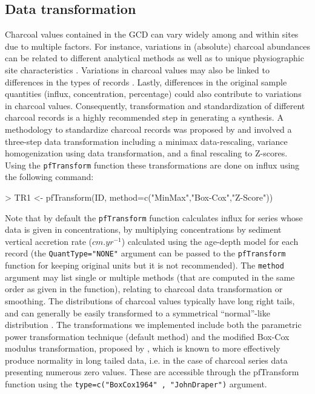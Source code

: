 \documentclass{elsarticle}
\begin{document}
\subsection{Data transformation}

Charcoal values contained in the GCD can vary widely among and within sites due to multiple factors. For instance, variations in (absolute) charcoal abundances can be related to different analytical methods \citetext{i.e. sediment treatment; \citealp{Tinner2003}} as well as to unique physiographic site characteristics \cite{Marlon2006}. Variations in charcoal values may also be linked to differences in the types of records \citetext{pollen slide charcoals, sieved charcoals, charcoal/pollen ratios, \citealt{Carcaillet2001a}}. Lastly, differences in the original sample quantities (influx, concentration, percentage) could also contribute to variations in charcoal values. Consequently, transformation and standardization of different charcoal records is a highly recommended step in generating a synthesis. A methodology to standardize charcoal records was proposed by \citet{Power2008} and involved a three-step data transformation including a minimax data-rescaling, variance homogenization using \citet{Box1964} data transformation, and a final rescaling to Z-scores. Using the \texttt{pfTransform} function these transformations are done on influx using the following command:

\begin{Schunk}
\begin{Sinput}
> TR1 <- pfTransform(ID, method=c("MinMax","Box-Cox","Z-Score"))
\end{Sinput}
\end{Schunk}


Note that by default the \texttt{pfTransform} function calculates influx for series whose data is given in concentrations, by multiplying concentrations by sediment vertical accretion rate ($cm.yr^{-1}$) calculated using the age-depth model for each record (the \texttt{QuantType="NONE"} argument can be passed to the \texttt{pfTransform} function for keeping original units but it is not recommended). The \texttt{method} argument may list single or multiple methods (that are computed in the same order as given in the function), relating to charcoal data transformation or smoothing. The distributions of charcoal values typically have long right tails, and can generally be easily transformed to a symmetrical “normal”-like distribution \cite{Higuera2011}.  The transformations we implemented include both the \citet{Box1964} parametric power transformation technique (default method) and the modified Box-Cox modulus transformation, proposed by \citet{John1980}, which is known to more effectively produce normality in long tailed data, i.e. in the case of charcoal series data presenting numerous zero values. These are accessible through the pfTransform function using the \texttt{type=c("BoxCox1964" , "JohnDraper")} argument. 
\end{document}
